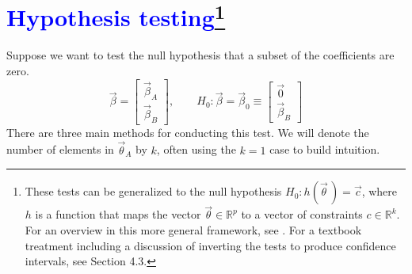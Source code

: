 \documentclass[11pt]{article}
\newcommand{\bblue}[1]{\textbf{\textcolor{blue}{#1}}}
\begin{document}
\newpage
\section*{\bblue{Hypothesis testing\footnote{These tests can be generalized to the null hypothesis $H_0: h(\vec\theta\,) = \vec{c}$, where $h$ is a function that maps the vector $\vec\theta\in\mathbb{R}^p$ to a vector of constraints $c\in \mathbb{R}^k$. For an overview in this more general framework, see \citet{rao2005}. For a textbook treatment including a discussion of inverting the tests to produce confidence intervals, see \citet{agresti2015} Section 4.3.}}}
Suppose we want to test the null hypothesis that a subset of the coefficients are zero.
$$\vec\beta = \begin{bmatrix} \vec\beta_A \\ \vec\beta_B \end{bmatrix},\qquad H_0: \vec\beta = \vec\beta_0 \equiv \begin{bmatrix} \vec{0} \\ \vec\beta_B \end{bmatrix}$$
There are three main methods for conducting this test. We will denote the number of elements in $\vec\theta_A$ by $k$, often using the $k=1$ case to build intuition. %
\end{document}
